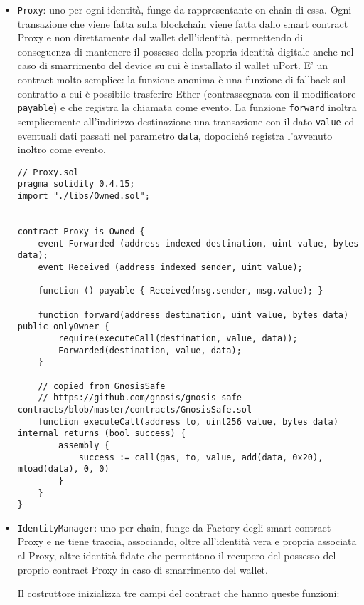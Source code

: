 \begin{itemize}
  \item \texttt{Proxy}: uno per ogni identità, funge da rappresentante on-chain di essa. Ogni transazione che viene fatta
  sulla blockchain viene fatta dallo smart contract Proxy e non direttamente dal wallet dell’identità, permettendo
  di conseguenza di mantenere il possesso della propria identità digitale anche nel caso di smarrimento del 
  device su cui è installato il wallet uPort.
  E' un contract molto semplice: la funzione anonima è una funzione di fallback sul contratto a cui è possibile
  trasferire Ether (contrassegnata con il modificatore \texttt{payable}) e che registra la chiamata come evento.
  La funzione \texttt{forward} inoltra semplicemente all'indirizzo destinazione una transazione con il dato \texttt{value}
  ed eventuali dati passati nel parametro \texttt{data}, dopodiché registra l'avvenuto inoltro come evento.

  \begin{lstlisting}[language=Solidity, numbers=none]
// Proxy.sol
pragma solidity 0.4.15;
import "./libs/Owned.sol";


contract Proxy is Owned {
    event Forwarded (address indexed destination, uint value, bytes data);
    event Received (address indexed sender, uint value);

    function () payable { Received(msg.sender, msg.value); }

    function forward(address destination, uint value, bytes data) public onlyOwner {
        require(executeCall(destination, value, data));
        Forwarded(destination, value, data);
    }

    // copied from GnosisSafe
    // https://github.com/gnosis/gnosis-safe-contracts/blob/master/contracts/GnosisSafe.sol
    function executeCall(address to, uint256 value, bytes data) internal returns (bool success) {
        assembly {
            success := call(gas, to, value, add(data, 0x20), mload(data), 0, 0)
        }
    }
}
  \end{lstlisting}
  
  \item \texttt{IdentityManager}: uno per chain, funge da Factory degli smart contract Proxy e ne tiene traccia,
  associando, oltre all’identità vera e propria associata al Proxy, altre identità fidate che permettono
  il recupero del possesso del proprio contract Proxy in caso di smarrimento del wallet.

  Il costruttore inizializza tre campi del contract che hanno queste funzioni:
  

\end{itemize}
